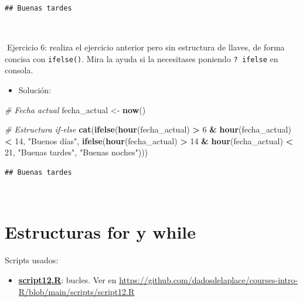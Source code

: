 \documentclass[11pt,]{book}
\newenvironment{Shaded}{\begin{snugshade}}{\end{snugshade}}
\newcommand{\CommentTok}[1]{\textcolor[rgb]{0.37,0.37,0.37}{\textit{#1}}}
\newcommand{\DecValTok}[1]{\textcolor[rgb]{0.06,0.06,0.06}{#1}}
\newcommand{\KeywordTok}[1]{\textcolor[rgb]{0.27,0.27,0.27}{\textbf{#1}}}
\newcommand{\NormalTok}[1]{#1}
\newcommand{\OperatorTok}[1]{\textcolor[rgb]{0.43,0.43,0.43}{\textbf{#1}}}
\newcommand{\StringTok}[1]{\textcolor[rgb]{0.5,0.5,0.5}{#1}}
\providecommand{\tightlist}{%
  \setlength{\itemsep}{0pt}\setlength{\parskip}{0pt}}
\begin{document}
\begin{verbatim}
## Buenas tardes
\end{verbatim}

~

📝Ejercicio 6: realiza el ejercicio anterior pero sin estructura de llaves, de forma concisa con \texttt{ifelse()}. Mira la ayuda si la necesitases poniendo \texttt{?\ ifelse} en consola.

\begin{itemize}
\tightlist
\item
  Solución:
\end{itemize}

\begin{Shaded}
\begin{Highlighting}[]
\CommentTok{# Fecha actual}
\NormalTok{fecha_actual <-}\StringTok{ }\KeywordTok{now}\NormalTok{()}

\CommentTok{# Estructura if-else}
\KeywordTok{cat}\NormalTok{(}\KeywordTok{ifelse}\NormalTok{(}\KeywordTok{hour}\NormalTok{(fecha_actual) }\OperatorTok{>}\StringTok{ }\DecValTok{6} \OperatorTok{&}\StringTok{ }\KeywordTok{hour}\NormalTok{(fecha_actual) }\OperatorTok{<}\StringTok{ }\DecValTok{14}\NormalTok{,}
           \StringTok{"Buenos días"}\NormalTok{,}
           \KeywordTok{ifelse}\NormalTok{(}\KeywordTok{hour}\NormalTok{(fecha_actual) }\OperatorTok{>}\StringTok{ }\DecValTok{14} \OperatorTok{&}
\StringTok{                    }\KeywordTok{hour}\NormalTok{(fecha_actual) }\OperatorTok{<}\StringTok{ }\DecValTok{21}\NormalTok{,}
                  \StringTok{"Buenas tardes"}\NormalTok{, }\StringTok{"Buenas noches"}\NormalTok{)))}
\end{Highlighting}
\end{Shaded}

\begin{verbatim}
## Buenas tardes
\end{verbatim}

~

\hypertarget{estructuras-for-y-while}{%
\section{Estructuras for y while}\label{estructuras-for-y-while}}

\begin{blackbox}

Scripts usados:

\begin{itemize}
\tightlist
\item
  \href{https://github.com/dadosdelaplace/courses-intro-R/blob/main/scripts/script12.R}{\textbf{script12.R}}: bucles. Ver en \url{https://github.com/dadosdelaplace/courses-intro-R/blob/main/scripts/script12.R}
\end{itemize}


\end{blackbox}
\end{document}
